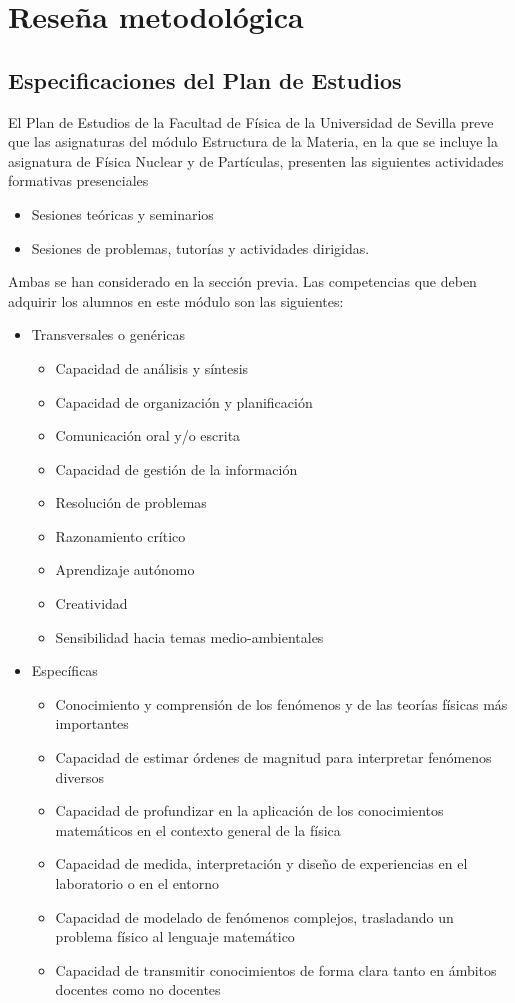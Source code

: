 \documentclass[a4paper,12pt,twoside]{article}
\begin{document}
\section{Reseña metodológica}

\subsection{Especificaciones del Plan de Estudios}

El Plan de Estudios de la Facultad de Física  de la Universidad de Sevilla preve que las asignaturas del módulo Estructura de la Materia, en la que se incluye la asignatura de Física Nuclear y de Partículas, presenten las siguientes actividades formativas presenciales

\begin{itemize}
\item Sesiones teóricas y seminarios
\item Sesiones de problemas, tutorías y actividades dirigidas.
\end{itemize}

Ambas se han considerado en la sección previa. Las competencias que deben adquirir los alumnos en este módulo son las siguientes:

\begin{itemize}
\item Transversales o genéricas
\begin{itemize}
\item Capacidad de análisis y síntesis
\item Capacidad de organización y planificación
\item Comunicación oral y/o escrita
\item Capacidad de gestión de la información
\item Resolución de problemas
\item Razonamiento crítico
\item Aprendizaje autónomo
\item Creatividad
\item Sensibilidad hacia temas medio-ambientales
\end{itemize}
\item Específicas
\begin{itemize}
\item Conocimiento y comprensión de los fenómenos y de las teorías físicas más importantes
\item Capacidad de estimar órdenes de magnitud para interpretar fenómenos diversos
\item Capacidad de profundizar en la aplicación de los conocimientos matemáticos en el contexto general de la física
\item Capacidad de medida, interpretación y diseño de experiencias en el laboratorio o en el entorno
\item Capacidad de modelado de fenómenos complejos, trasladando un problema físico al lenguaje matemático
\item Capacidad de transmitir conocimientos de forma clara tanto en ámbitos docentes como no docentes
\end{itemize}
\end{itemize}
\end{document}
